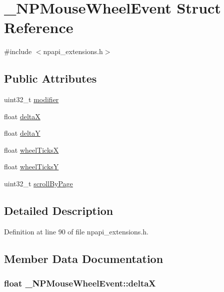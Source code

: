 \hypertarget{struct___n_p_mouse_wheel_event}{
\section{\_\-NPMouseWheelEvent Struct Reference}
\label{struct___n_p_mouse_wheel_event}
}


{\ttfamily \#include $<$npapi\_\-extensions.h$>$}

\subsection*{Public Attributes}
\begin{DoxyCompactItemize}
\item 
uint32\_\-t \hyperlink{struct___n_p_mouse_wheel_event_aebfe75b9fd698e72eded59a431cb6976}{modifier}
\item 
float \hyperlink{struct___n_p_mouse_wheel_event_acb1f05cb87caff0e49ba2d7f131f0222}{deltaX}
\item 
float \hyperlink{struct___n_p_mouse_wheel_event_a57c3e96087783814df9687807b474b2b}{deltaY}
\item 
float \hyperlink{struct___n_p_mouse_wheel_event_af31de66fa204cc6541fafca99055218c}{wheelTicksX}
\item 
float \hyperlink{struct___n_p_mouse_wheel_event_a49f5b57beb96322c9a3a13e5e064184d}{wheelTicksY}
\item 
uint32\_\-t \hyperlink{struct___n_p_mouse_wheel_event_aa790a7baeea6d6a73ae416855b037875}{scrollByPage}
\end{DoxyCompactItemize}


\subsection{Detailed Description}


Definition at line 90 of file npapi\_\-extensions.h.



\subsection{Member Data Documentation}
\hypertarget{struct___n_p_mouse_wheel_event_acb1f05cb87caff0e49ba2d7f131f0222}{
\subsubsection[{deltaX}]{\setlength{\rightskip}{0pt plus 5cm}float {\bf \_\-NPMouseWheelEvent::deltaX}}}
\label{struct___n_p_mouse_wheel_event_acb1f05cb87caff0e49ba2d7f131f0222}


